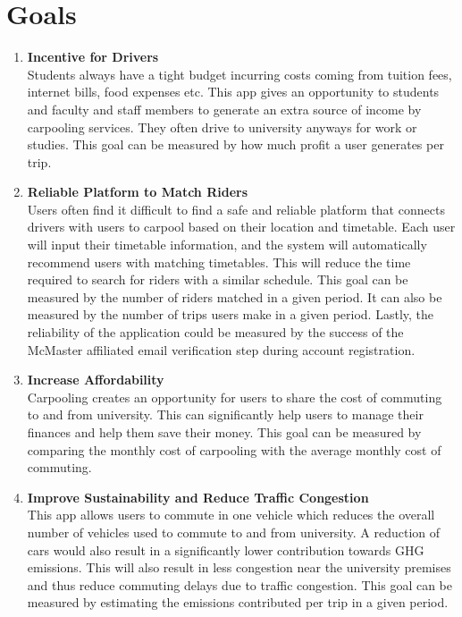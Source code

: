 \documentclass{article}
\begin{document}
\section{Goals}
\begin{enumerate}
\item \textbf{Incentive for Drivers}\\ 
Students always have a tight budget incurring costs coming from tuition fees, internet bills, food expenses etc. This app gives an opportunity to students and faculty and staff members to generate an extra source of income by carpooling services. They often drive to university anyways for work or studies. This goal can be measured by how much profit a user generates per trip.  

\item \textbf{Reliable Platform to Match Riders} \\
Users often find it difficult to find a safe and reliable platform that connects drivers with users to carpool based on their location and timetable. Each user will input their timetable information, and the system will automatically recommend users with matching timetables. This will reduce the time required to search for riders with a similar schedule. This goal can be measured by the number of riders matched in a given period. It can also be measured by the number of trips users make in a given period. Lastly, the reliability of the application could be measured by the success of the McMaster affiliated email verification step during account registration.

\item \textbf{Increase Affordability} \\
Carpooling creates an opportunity for users to share the cost of commuting to and from university. This can significantly help users to manage their finances and help them save their money. This goal can be measured by comparing the monthly cost of carpooling with the average monthly cost of commuting.

\item \textbf{Improve Sustainability and Reduce Traffic Congestion} \\
This app allows users to commute in one vehicle which reduces the overall number of vehicles used to commute to and from university. A reduction of cars would also result in a significantly lower contribution towards GHG emissions. This will also result in less congestion near the university premises and thus reduce commuting delays due to traffic congestion.  This goal can be measured by estimating the emissions contributed per trip in a given period.  


\end{enumerate}
\end{document}
